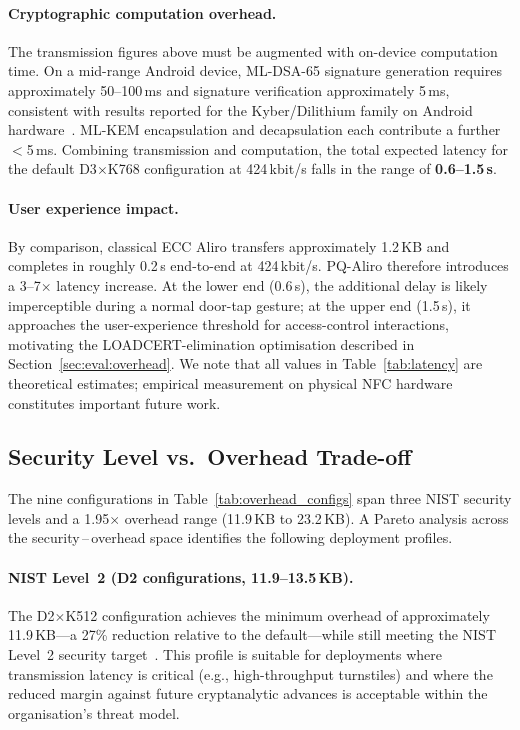 \documentclass[runningheads]{llncs}
\begin{document}
\paragraph{Cryptographic computation overhead.}
The transmission figures above must be augmented with on-device computation
time.  On a mid-range Android device, ML-DSA-65 signature generation
requires approximately 50–100\,ms and signature verification approximately
5\,ms, consistent with results reported for the Kyber/Dilithium family on
Android hardware~\cite{NIST3PQC:Lima21,TCHES:BKHYY22}.  ML-KEM encapsulation and
decapsulation each contribute a further $<$5\,ms.  Combining transmission
and computation, the total expected latency for the default D3$\times$K768
configuration at 424\,kbit/s falls in the range of \textbf{0.6–1.5\,s}.

\paragraph{User experience impact.}
By comparison, classical ECC Aliro transfers approximately 1.2\,KB and
completes in roughly 0.2\,s end-to-end at 424\,kbit/s.  PQ-Aliro therefore
introduces a 3–7$\times$ latency increase.  At the lower end (0.6\,s), the
additional delay is likely imperceptible during a normal door-tap gesture;
at the upper end (1.5\,s), it approaches the user-experience threshold for
access-control interactions, motivating the LOADCERT-elimination optimisation
described in Section~\ref{sec:eval:overhead}.  We note that all values in
Table~\ref{tab:latency} are theoretical estimates; empirical measurement on
physical NFC hardware constitutes important future work.

\subsection{Security Level vs.\ Overhead Trade-off}
\label{sec:eval:tradeoff}

The nine configurations in Table~\ref{tab:overhead_configs} span three
NIST security levels and a 1.95$\times$ overhead range (11.9\,KB to
23.2\,KB).  A Pareto analysis across the security\,–\,\allowbreak overhead space identifies
the following deployment profiles.

\paragraph{NIST Level~2 (D2 configurations, 11.9–13.5\,KB).}
The D2$\times$K512 configuration achieves the minimum overhead of
approximately 11.9\,KB—a 27\% reduction relative to the default—while still
meeting the NIST Level~2 security target~\cite{NIST:FIPS203,NIST:FIPS204}.
This profile is suitable for deployments where transmission latency is
critical (e.g., high-throughput turnstiles) and where the reduced margin
against future cryptanalytic advances is acceptable within the organisation's
threat model.
\end{document}
